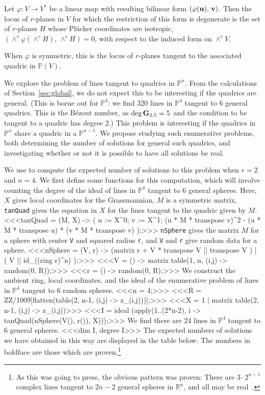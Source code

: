 \begin{theorem}
Let $\varphi\colon V\to V^*$ be a linear map with resulting bilinear form
$(\varphi({\bf u}),\,{\bf v})$.
Then the locus of $r$-planes in $V$ for which the restriction of this form
is degenerate is the set of $r$-planes $H$ whose Pl\"ucker
coordinates are
isotropic, $(\wedge^r\varphi(\wedge^rH),\,\wedge^rH)=0$, with respect to the
induced form on $\wedge^rV$.

When $\varphi$ is symmetric, this is the locus of $r$-planes tangent to the
associated quadric in ${\mathbb P}(V)$.
\end{theorem}


We explore the problem of lines tangent to quadrics in ${\mathbb P}^n$.
From the calculations of Section~\ref{sec:global}, we do not expect this to
be interesting if the quadrics are general.
(This is borne out for ${\mathbb P}^4$:
 we find 320 lines in ${\mathbb P}^4$ tangent to 6 general quadrics.
 This is the B\'ezout number, as $\deg{\bf G}_{2,5}=5$
 and the condition to be tangent to a quadric has degree 2.)
This problem is interesting if the quadrics 
in ${\mathbb P}^n$ share a quadric in a ${\mathbb P}^{n-1}$.
We propose studying such enumerative problems, both determining the 
number of solutions for general such quadrics, and investigating whether or
not it is possible to have all solutions be real. 

We use \Mtwo{}\/ to compute the expected number of
solutions to this problem when $r=2$ and $n=4$.
We first define some functions for this computation, which will involve
counting the degree of the ideal of lines in ${\mathbb P}^4$ tangent to 6
general spheres.
Here, $X$ gives local coordinates for the Grassmannian,
$M$ is a symmetric matrix, {\tt tanQuad} gives the equation in $X$ for the
lines tangent to the quadric given by $M$.
%
<<<tanQuad = (M, X) -> (
     u := X^{0};
     v := X^{1};
     (u * M * transpose v)^2 - 
     (u * M * transpose u) * (v * M * transpose v)
     );>>>
%
{\tt nSphere} gives the matrix $M$ for a sphere with
center {\tt V} and squared radius {\tt r}, and {\tt V} and {\tt r} give random
data for a sphere.
%
<<<nSphere = (V, r) -> 
         (matrix {{r + V * transpose V}} || transpose V ) |
         ( V || id_((ring r)^n)
         );>>>
%
<<<V = () -> matrix table(1, n, (i,j) -> random(0, R));>>>
%
<<<r = () -> random(0, R);>>>
%
We construct the ambient ring, local coordinates, and the ideal of the
enumerative problem of lines in ${\mathbb P}^4$ tangent to 6 random spheres.
%
<<<n = 4;>>>
%
<<<R = ZZ/1009[flatten(table(2, n-1, (i,j) -> z_(i,j)))];>>>
%
<<<X = 1 | matrix table(2, n-1, (i,j) -> z_(i,j))>>>
%
<<<I = ideal (apply(1..(2*n-2), 
               i -> tanQuad(nSphere(V(), r()), X)));>>>
%
We find there are 24 lines in ${\mathbb P}^4$ tangent to 6 general spheres.
<<<dim I, degree I>>>
%
The expected numbers of solutions we have obtained in this way are displayed
in the table below.
The numbers in boldface are those which are proven.\footnote{As this was
going to press, the obvious pattern was proven:
There are $3\cdot 2^{n-1}$ complex lines tangent to $2n-2$ 
general spheres in ${\mathbb R}^n$, and all may be real~\cite{SO:STh01}.}

